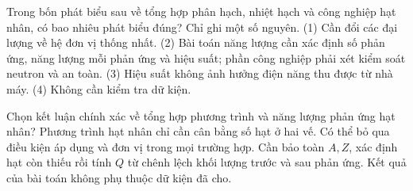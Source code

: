 \begin{ex}
Trong bốn phát biểu sau về tổng hợp phân hạch, nhiệt hạch và công nghiệp hạt nhân, có bao nhiêu phát biểu đúng? Chỉ ghi một số nguyên. (1) Cần đổi các đại lượng về hệ đơn vị thống nhất. (2) Bài toán năng lượng cần xác định số phản ứng, năng lượng mỗi phản ứng và hiệu suất; phần công nghiệp phải xét kiểm soát neutron và an toàn. (3) Hiệu suất không ảnh hưởng điện năng thu được từ nhà máy. (4) Không cần kiểm tra dữ kiện.
\end{ex}

\begin{ex}
Chọn kết luận chính xác về tổng hợp phương trình và năng lượng phản ứng hạt nhân?
\choice
{Phương trình hạt nhân chỉ cần cân bằng số hạt ở hai vế.}
{Có thể bỏ qua điều kiện áp dụng và đơn vị trong mọi trường hợp.}
{\True Cần bảo toàn $A,Z$, xác định hạt còn thiếu rồi tính $Q$ từ chênh lệch khối lượng trước và sau phản ứng.}
{Kết quả của bài toán không phụ thuộc dữ kiện đã cho.}
\end{ex}

